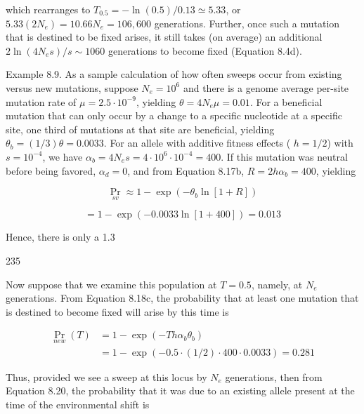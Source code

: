 \documentclass{article}
\begin{document}
which rearranges to  $ T_{0.5} = -\ln(0.5)/0.13 \simeq 5.33 $, or  $ 5.33(2N_e) = 10.66N_e = 106,600 $ generations. Further, once such a mutation that is destined to be fixed arises, it still takes (on average) an additional  $ 2\ln(4N_e s)/s \sim 1060 $ generations to become fixed (Equation 8.4d).

Example 8.9. As a sample calculation of how often sweeps occur from existing versus new mutations, suppose  $ N_e = 10^6 $ and there is a genome average per-site mutation rate of  $ \mu = 2.5 \cdot 10^{-9} $, yielding  $ \theta = 4N_e\mu = 0.01 $. For a beneficial mutation that can only occur by a change to a specific nucleotide at a specific site, one third of mutations at that site are beneficial, yielding  $ \theta_b = (1/3)\theta = 0.0033 $. For an allele with additive fitness effects ( $ h = 1/2 $) with  $ s = 10^{-4} $, we have  $ \alpha_b = 4N_e s = 4 \cdot 10^6 \cdot 10^{-4} = 400 $. If this mutation was neutral before being favored,  $ \alpha_d = 0 $, and from Equation 8.17b,  $ R = 2h\alpha_b = 400 $, yielding

\begin{equation}
\Pr_{sv}\approx1-\exp\left(-\theta_{b}\ln[1+R]\right)
\end{equation}

\begin{equation}
=1-\exp\left(-0.0033\ln[1+400]\right)=0.013
\end{equation}

Hence, there is only a 1.3%

235

Now suppose that we examine this population at  $ T = 0.5 $, namely, at  $ N_e $ generations. From Equation 8.18c, the probability that at least one mutation that is destined to become fixed will arise by this time is

\begin{equation}
\begin{aligned}\Pr_{new}(T)&=1-\exp\left(-Th\alpha_{b}\theta_{b}\right)\\&=1-\exp\left(-0.5\cdot\left(1/2\right)\cdot400\cdot0.0033\right)=0.281\end{aligned}
\end{equation}

Thus, provided we see a sweep at this locus by  $ N_{e} $ generations, then from Equation 8.20, the probability that it was due to an existing allele present at the time of the environmental shift is
\end{document}
